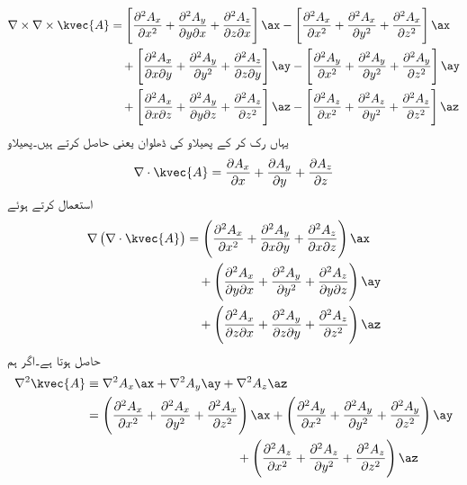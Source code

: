 \begin{gather}
\begin{aligned}\label{مساوات_مقناطیسی_گردش_کی_گردش_الف}
\nabla \times \nabla \times \kvec{A}&=\left[\frac{\partial^2 A_x}{\partial x^2}+\frac{\partial^2 A_y}{\partial y\partial x}+\frac{\partial^2 A_z}{\partial z\partial x}\right]\ax-\left[\frac{\partial^2 A_x}{\partial x^2}+\frac{\partial^2 A_x}{\partial y^2} +\frac{\partial^2 A_x}{\partial z^2} \right]\ax\\
& \quad +\left[\frac{\partial^2 A_x}{\partial x\partial y}+\frac{\partial^2 A_y}{\partial y^2}+ \frac{\partial^2 A_z}{\partial z\partial y}\right]\ay-\left[\frac{\partial^2 A_y}{\partial x^2}+\frac{\partial^2 A_y}{\partial y^2}+\frac{\partial^2 A_y}{\partial z^2} \right]\ay\\
&\quad +\left[ \frac{\partial^2 A_x}{\partial x\partial z}+\frac{\partial^2 A_y}{\partial y\partial z}+\frac{\partial^2 A_z}{\partial z^2}\right]\az-\left[\frac{\partial^2 A_z}{\partial x^2}+\frac{\partial^2 A_z}{\partial y^2}+ \frac{\partial^2 A_z}{\partial z^2} \right]\az
\end{aligned}
\end{gather}
یہاں رک کر  کے پھیلاو کی ڈھلوان یعنی  حاصل کرتے ہیں۔پھیلاو
\begin{align*}
\nabla \cdot \kvec{A}=\frac{\partial A_x}{\partial x}+\frac{\partial A_y}{\partial y}+\frac{\partial A_z}{\partial z}
\end{align*}
استعمال کرتے ہوئے
\begin{gather}
\begin{aligned}
\nabla \left(\nabla \cdot \kvec{A} \right)&=\left(\frac{\partial^2 A_x}{\partial x^2}+\frac{\partial^2 A_y}{\partial x  \partial y}+\frac{\partial^2 A_z}{\partial x  \partial z} \right)\ax\\
&\quad +\left(\frac{\partial^2 A_x}{\partial y \partial x}+\frac{\partial^2 A_y}{\partial y^2}+\frac{\partial^2 A_z}{\partial y  \partial z} \right)\ay\\
&\quad +\left(\frac{\partial^2 A_x}{\partial z \partial x}+\frac{\partial^2 A_y}{\partial z\partial y}+\frac{\partial^2 A_z}{\partial z^2} \right)\az\\
\end{aligned}
\end{gather}
حاصل ہوتا ہے۔اگر ہم
\begin{gather}
\begin{aligned}\label{مساوات_مقناطیسی_سمتی_لاپلاسی}
\begin{split}
\nabla^2 \kvec{A} &\equiv \nabla^2 A_x \ax+\nabla^2 A_y \ay+\nabla^2 A_z \az\\
&=\left(\frac{\partial^2 A_x}{\partial x^2}+\frac{\partial^2 A_x}{\partial y^2}+\frac{\partial^2 A_x}{\partial z^2} \right)\ax+\left(\frac{\partial^2 A_y}{\partial x^2}+\frac{\partial^2 A_y}{\partial y^2}+\frac{\partial^2 A_y}{\partial z^2} \right)\ay \\ 
& \quad \quad \quad \quad  \quad \quad\quad \quad \quad \quad  \quad \quad  +\left(\frac{\partial^2 A_z}{\partial x^2}+\frac{\partial^2 A_z}{\partial y^2}+\frac{\partial^2 A_z}{\partial z^2} \right)\az
\end{split}
\end{aligned}
\end{gather}

